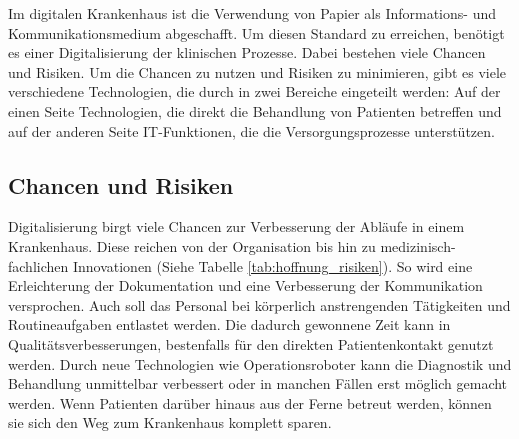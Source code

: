 Im digitalen Krankenhaus ist die Verwendung von Papier als Informations- und Kommunikationsmedium abgeschafft. Um diesen Standard zu erreichen, benötigt es einer Digitalisierung der klinischen Prozesse. Dabei bestehen viele Chancen und Risiken. Um die Chancen zu nutzen und Risiken zu minimieren, gibt es viele verschiedene Technologien, die durch \cite{braeutigam2017} in zwei Bereiche eingeteilt werden: Auf der einen Seite Technologien, die direkt die Behandlung von Patienten betreffen und auf der anderen Seite IT-Funktionen, die die Versorgungsprozesse unterstützen.
\subsection{Chancen und Risiken}
Digitalisierung birgt viele Chancen zur Verbesserung der Abläufe in einem Krankenhaus. Diese reichen von der Organisation bis hin zu medizinisch-fachlichen Innovationen (Siehe Tabelle \ref{tab:hoffnung_risiken}). So wird eine Erleichterung der Dokumentation und eine Verbesserung der Kommunikation versprochen. Auch soll das Personal bei körperlich anstrengenden Tätigkeiten und Routineaufgaben entlastet werden. Die dadurch gewonnene Zeit kann in Qualitätsverbesserungen, bestenfalls für den direkten Patientenkontakt genutzt werden. Durch neue Technologien wie Operationsroboter kann die Diagnostik und Behandlung unmittelbar verbessert oder in manchen Fällen erst möglich gemacht werden. Wenn Patienten darüber hinaus aus der Ferne betreut werden, können sie sich den Weg zum Krankenhaus komplett sparen. \parencite{braeutigam2017}\\

